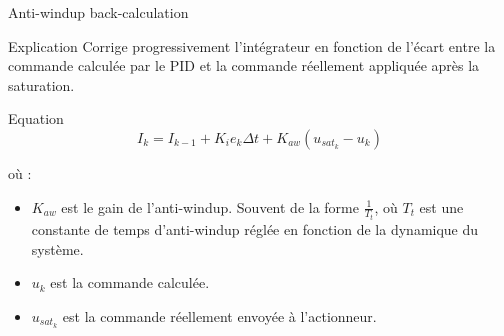 \begin{frame}{Anti-windup back-calculation}
    \begin{block}{Explication}
    Corrige progressivement l'intégrateur en fonction de l'écart entre la commande calculée par le PID et la commande réellement appliquée après la saturation.
    \end{block}
    
    \begin{block}{Equation}
    $$I_{k} = I_{k-1} + K_i e_{k} \Delta t + K_{aw} (u_{sat_k} - u_{k})$$
    
    où :
\begin{itemize}
    \item $K_{aw}$ est le gain de l'anti-windup. Souvent de la forme $\frac{1}{T_{t}}$, où $T_{t}$ est une constante de temps d'anti-windup réglée en fonction de la dynamique du système.
    \item $u_{k}$ est la commande calculée.
    \item $u_{sat_k}$ est la commande réellement envoyée à l'actionneur.
\end{itemize}
    \end{block}
\end{frame}

